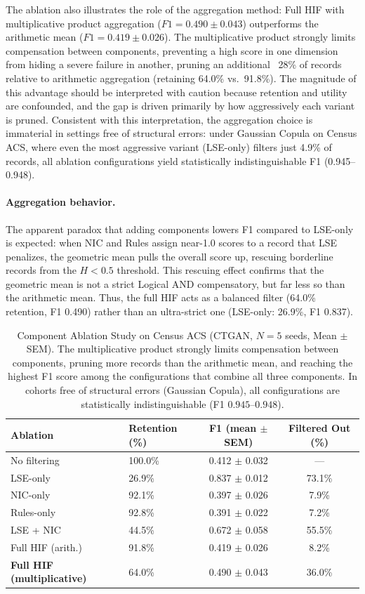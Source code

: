 \documentclass[pdflatex,sn-mathphys-num]{sn-jnl}
\theoremstyle{thmstyleone}%
\theoremstyle{thmstyletwo}%
\theoremstyle{thmstylethree}%
\begin{document}
The ablation also illustrates the role of the aggregation method: Full HIF with multiplicative product aggregation ($F1 = 0.490 \pm 0.043$) outperforms the arithmetic mean ($F1 = 0.419 \pm 0.026$). The multiplicative product strongly limits compensation between components, preventing a high score in one dimension from hiding a severe failure in another, pruning an additional ~28\% of records relative to arithmetic aggregation (retaining 64.0\% vs.\ 91.8\%). The magnitude of this advantage should be interpreted with caution because retention and utility are confounded, and the gap is driven primarily by how aggressively each variant is pruned. Consistent with this interpretation, the aggregation choice is immaterial in settings free of structural errors: under Gaussian Copula on Census ACS, where even the most aggressive variant (LSE-only) filters just 4.9\% of records, all ablation configurations yield statistically indistinguishable F1 (0.945--0.948).


\paragraph{Aggregation behavior.} The apparent paradox that adding components lowers F1 compared to LSE-only is expected: when NIC and Rules assign near-1.0 scores to a record that LSE penalizes, the geometric mean pulls the overall score up, rescuing borderline records from the $H < 0.5$ threshold. This rescuing effect confirms that the geometric mean is not a strict Logical AND compensatory, but far less so than the arithmetic mean. Thus, the full HIF acts as a balanced filter (64.0\% retention, F1 0.490) rather than an ultra-strict one (LSE-only: 26.9\%, F1 0.837).

\begin{table}[htbp]
\centering
\caption{Component Ablation Study on Census ACS (CTGAN, $N=5$ seeds, Mean $\pm$ SEM). The multiplicative product strongly limits compensation between components, pruning more records than the arithmetic mean, and reaching the highest F1 score among the configurations that combine all three components. In cohorts free of structural errors (Gaussian Copula), all configurations are statistically indistinguishable (F1 $0.945$--$0.948$).}
\label{tab:ablation}
\begin{tabular}{@{}llcc@{}}
\toprule
\textbf{Ablation} & \textbf{Retention (\%)} & \textbf{F1 (mean $\pm$ SEM)} & \textbf{Filtered Out (\%)} \\
\midrule
No filtering & 100.0\% & 0.412 $\pm$ 0.032 & --- \\
LSE-only & 26.9\% & 0.837 $\pm$ 0.012 & 73.1\% \\
NIC-only & 92.1\% & 0.397 $\pm$ 0.026 & 7.9\% \\
Rules-only & 92.8\% & 0.391 $\pm$ 0.022 & 7.2\% \\
LSE + NIC & 44.5\% & 0.672 $\pm$ 0.058 & 55.5\% \\
Full HIF (arith.) & 91.8\% & 0.419 $\pm$ 0.026 & 8.2\% \\
\textbf{Full HIF (multiplicative)} & 64.0\% & 0.490 $\pm$ 0.043 & 36.0\% \\
\bottomrule
\end{tabular}
\end{table}
\end{document}
